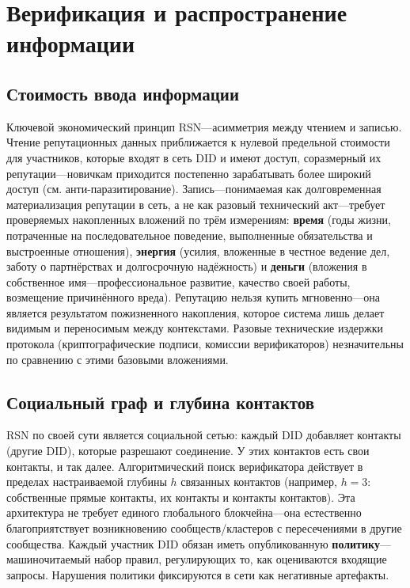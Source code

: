 \documentclass[11pt,a4paper,twocolumn]{article}
\begin{document}
\section{Верификация и распространение информации}

\subsection{Стоимость ввода информации}

Ключевой экономический принцип RSN---асимметрия между чтением и записью. Чтение репутационных данных приближается к нулевой предельной стоимости для участников, которые входят в сеть DID и имеют доступ, соразмерный их репутации---новичкам приходится постепенно зарабатывать более широкий доступ (см. анти-паразитирование). Запись---понимаемая как долговременная материализация репутации в сеть, а не как разовый технический акт---требует проверяемых накопленных вложений по трём измерениям: \textbf{время} (годы жизни, потраченные на последовательное поведение, выполненные обязательства и выстроенные отношения), \textbf{энергия} (усилия, вложенные в честное ведение дел, заботу о партнёрствах и долгосрочную надёжность) и \textbf{деньги} (вложения в собственное имя---профессиональное развитие, качество своей работы, возмещение причинённого вреда). Репутацию нельзя купить мгновенно---она является результатом пожизненного накопления, которое система лишь делает видимым и переносимым между контекстами. Разовые технические издержки протокола (криптографические подписи, комиссии верификаторов) незначительны по сравнению с этими базовыми вложениями.

\subsection{Социальный граф и глубина контактов}

RSN по своей сути является социальной сетью: каждый DID добавляет контакты (другие DID), которые разрешают соединение. У этих контактов есть свои контакты, и так далее. Алгоритмический поиск верификатора действует в пределах настраиваемой глубины $h$ связанных контактов (например, $h=3$: собственные прямые контакты, их контакты и контакты контактов). Эта архитектура не требует единого глобального блокчейна---она естественно благоприятствует возникновению сообществ/кластеров с пересечениями в другие сообщества. Каждый участник DID обязан иметь опубликованную \textbf{политику}---машиночитаемый набор правил, регулирующих то, как оцениваются входящие запросы. Нарушения политики фиксируются в сети как негативные артефакты.
\end{document}
